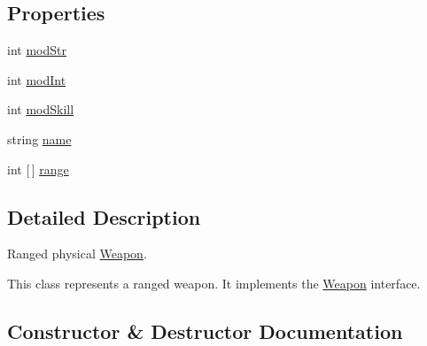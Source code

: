 \subsection*{Properties}
\begin{DoxyCompactItemize}
\item 
int \hyperlink{class_model_1_1_weapon_module_1_1_short_bow_a8b72cafa7bda999d4f89917fd3d53336}{mod\+Str}
\item 
int \hyperlink{class_model_1_1_weapon_module_1_1_short_bow_a194e2a18288333ab473162ecc0e03f06}{mod\+Int}
\item 
int \hyperlink{class_model_1_1_weapon_module_1_1_short_bow_a7a263e41527b007e5d26e9a6e420d0b7}{mod\+Skill}
\item 
string \hyperlink{class_model_1_1_weapon_module_1_1_short_bow_a9b44d9d2d2df34bed52509ed217aee68}{name}
\item 
int \mbox{[}$\,$\mbox{]} \hyperlink{class_model_1_1_weapon_module_1_1_short_bow_aa08fd974333e0b465cf712e4f4d25505}{range}
\end{DoxyCompactItemize}


\subsection{Detailed Description}
Ranged physical \hyperlink{interface_model_1_1_weapon_module_1_1_weapon}{Weapon}. 

This class represents a ranged weapon. It implements the \hyperlink{interface_model_1_1_weapon_module_1_1_weapon}{Weapon} interface. 

\subsection{Constructor \& Destructor Documentation}
\hypertarget{class_model_1_1_weapon_module_1_1_short_bow_a2b49cb683d778bb89ceed9bd2cec92c6}{}\label{class_model_1_1_weapon_module_1_1_short_bow_a2b49cb683d778bb89ceed9bd2cec92c6} 
